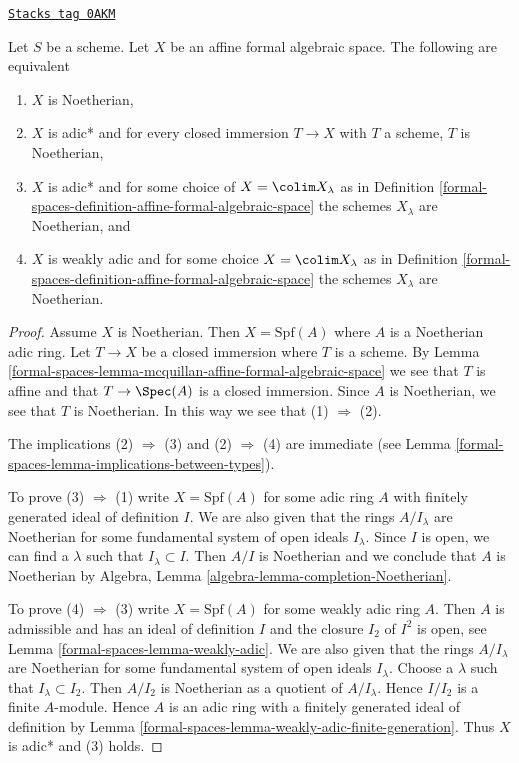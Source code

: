 \begin{lemma}
\label{formal-spaces-lemma-characterize-noetherian-affine}
\href{https://stacks.math.columbia.edu/tag/0AKM}{\texttt{Stacks tag 0AKM}}

Let $S$ be a scheme. Let $X$ be an affine formal algebraic space.
The following are equivalent
\begin{enumerate}
\item $X$ is Noetherian,
\item $X$ is adic* and for every closed immersion $T \to X$ with $T$ a scheme,
$T$ is Noetherian,
\item $X$ is adic* and for some choice of $X = \colim X_\lambda$ as in
Definition \ref{formal-spaces-definition-affine-formal-algebraic-space}
the schemes $X_\lambda$ are Noetherian, and
\item $X$ is weakly adic and for some choice $X = \colim X_\lambda$
as in Definition \ref{formal-spaces-definition-affine-formal-algebraic-space}
the schemes $X_\lambda$ are Noetherian.
\end{enumerate}
\end{lemma}

\begin{proof}
Assume $X$ is Noetherian. Then $X = \text{Spf}(A)$ where
$A$ is a Noetherian adic ring.
Let $T \to X$ be a closed immersion where $T$ is a scheme.
By Lemma \ref{formal-spaces-lemma-mcquillan-affine-formal-algebraic-space}
we see that $T$ is affine and that $T \to \Spec(A)$ is a closed
immersion. Since $A$ is Noetherian, we see that $T$ is Noetherian.
In this way we see that (1) $\Rightarrow$ (2).

\medskip\noindent
The implications (2) $\Rightarrow$ (3) and (2) $\Rightarrow$ (4) are
immediate (see Lemma \ref{formal-spaces-lemma-implications-between-types}).

\medskip\noindent
To prove (3) $\Rightarrow$ (1) write $X = \text{Spf}(A)$
for some adic ring $A$ with finitely generated ideal of definition $I$.
We are also given that the rings $A/I_\lambda$ are Noetherian
for some fundamental system of open ideals $I_\lambda$.
Since $I$ is open, we can find a $\lambda$ such that $I_\lambda \subset I$.
Then $A/I$ is Noetherian and we conclude that $A$ is Noetherian by
Algebra, Lemma \ref{algebra-lemma-completion-Noetherian}.

\medskip\noindent
To prove (4) $\Rightarrow$ (3) write $X = \text{Spf}(A)$
for some weakly adic ring $A$. Then $A$ is admissible and
has an ideal of definition $I$ and the closure $I_2$ of $I^2$
is open, see Lemma \ref{formal-spaces-lemma-weakly-adic}.
We are also given that the rings $A/I_\lambda$ are Noetherian
for some fundamental system of open ideals $I_\lambda$.
Choose a $\lambda$ such that $I_\lambda \subset I_2$.
Then $A/I_2$ is Noetherian as a quotient of $A/I_\lambda$.
Hence $I/I_2$ is a finite $A$-module.
Hence $A$ is an adic ring with a finitely generated ideal
of definition by Lemma \ref{formal-spaces-lemma-weakly-adic-finite-generation}.
Thus $X$ is adic* and (3) holds.
\end{proof}

